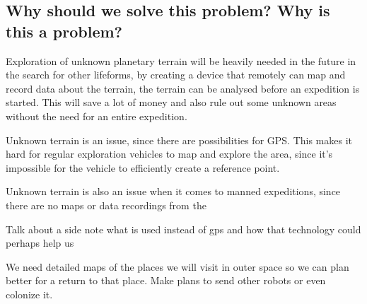 \subsection{Why should we solve this problem? Why is this a problem?}

Exploration of unknown planetary terrain will be heavily needed in the future in the search for other lifeforms, by creating a device that remotely can map and record data about the terrain, the terrain can be analysed before an expedition is started. This will save a lot of money and also rule out some unknown areas without the need for an entire expedition.

Unknown terrain is an issue, since there are possibilities for GPS. This makes it hard for regular exploration vehicles to map and explore the area, since it's impossible for the vehicle to efficiently create a reference point.

Unknown terrain is also an issue when it comes to manned expeditions, since there are no maps or data recordings from the






Talk about a side note what is used instead of gps and how that technology could perhaps help us

We need detailed maps of the places we will visit in outer space so we can plan better for a return to that place. Make plans to send other robots or even colonize it.




